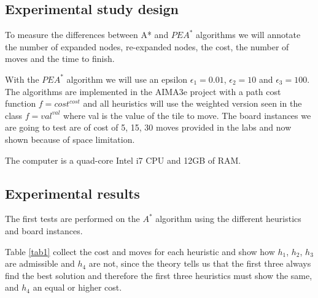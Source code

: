 \documentclass[runningheads]{llncs}
\begin{document}
\subsection{Experimental study design}
To measure the differences between A* and \(PEA^*\) algorithms we will annotate 
the number of expanded nodes, re-expanded nodes, the cost, the number of moves and the time to finish.

With the \(PEA^*\) algorithm we will use an epsilon $\epsilon_1=0.01$, $\epsilon_2=10$ and $\epsilon_3=100$.
The algorithms are implemented in the AIMA3e project with a path cost function $f={cost}^{cost}$ and 
all heuristics will use the weighted version seen in the class $f={val}^{val}$ 
where val is the value of the tile to move.
The board instances we are going to test are of cost of 5, 15, 30 moves provided in the labs and now shown because of space limitation.

The computer is a quad-core Intel i7 CPU and 12GB of RAM.
\subsection{Experimental results}
The first tests are performed on the \(A^*\) algorithm using the different heuristics and board instances.

Table \ref{tab1} collect the cost and moves for each heuristic and show how $h_1$, $h_2$, $h_3$ are admissible and $h_4$ are not,
since the theory tells us that the first three always find the best solution and therefore the first three heuristics must show the same, and $h_4$ an equal or higher cost.
\end{document}
